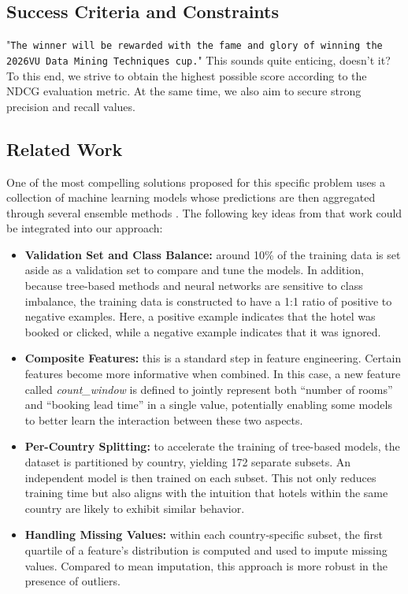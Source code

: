 \documentclass[runningheads]{llncs}
\begin{document}
\subsection{Success Criteria and Constraints}

"\texttt{The winner will be rewarded with the fame and glory of winning the 2026VU Data Mining Techniques cup.}" This sounds quite enticing, doesn't it? To this end, we strive to obtain the highest possible score according to the NDCG evaluation metric. At the same time, we also aim to secure strong precision and recall values.

\subsection{Related Work}

One of the most compelling solutions proposed for this specific problem uses a collection of machine learning models whose predictions are then aggregated through several ensemble methods \cite{DBLP:journals/corr/LiuXZYPLSW13}. The following key ideas from that work could be integrated into our approach:
\begin{itemize}
    \item \textbf{Validation Set and Class Balance: }around 10\% of the training data is set aside as a validation set to compare and tune the models. In addition, because tree-based methods and neural networks are sensitive to class imbalance, the training data is constructed to have a 1:1 ratio of positive to negative examples. Here, a positive example indicates that the hotel was booked or clicked, while a negative example indicates that it was ignored.
    \item \textbf{Composite Features: }this is a standard step in feature engineering. Certain features become more informative when combined. In this case, a new feature called \textit{count\_window} is defined to jointly represent both “number of rooms” and “booking lead time” in a single value, potentially enabling some models to better learn the interaction between these two aspects.
    \item \textbf{Per-Country Splitting: }to accelerate the training of tree-based models, the dataset is partitioned by country, yielding 172 separate subsets. An independent model is then trained on each subset. This not only reduces training time but also aligns with the intuition that hotels within the same country are likely to exhibit similar behavior.
    \item \textbf{Handling Missing Values: }within each country-specific subset, the first quartile of a feature’s distribution is computed and used to impute missing values. Compared to mean imputation, this approach is more robust in the presence of outliers.
\end{itemize}
\end{document}

